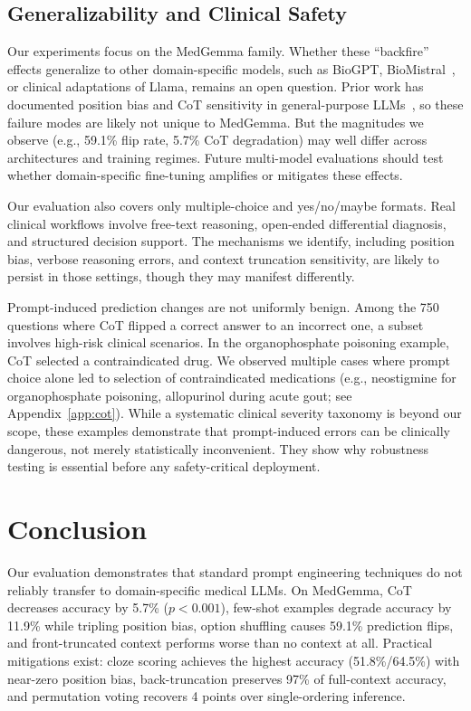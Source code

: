 \documentclass[runningheads,a4paper]{llncs}
\begin{document}
\subsection{Generalizability and Clinical Safety}

Our experiments focus on the MedGemma family. Whether these ``backfire'' effects generalize to other domain-specific models, such as BioGPT, BioMistral~\cite{labrak2024biomistral}, or clinical adaptations of Llama, remains an open question. Prior work has documented position bias and CoT sensitivity in general-purpose LLMs~\cite{zheng2024llm,liu2024mindyourstep}, so these failure modes are likely not unique to MedGemma. But the magnitudes we observe (e.g., 59.1\% flip rate, 5.7\% CoT degradation) may well differ across architectures and training regimes. Future multi-model evaluations should test whether domain-specific fine-tuning amplifies or mitigates these effects.

Our evaluation also covers only multiple-choice and yes/no/maybe formats. Real clinical workflows involve free-text reasoning, open-ended differential diagnosis, and structured decision support. The mechanisms we identify, including position bias, verbose reasoning errors, and context truncation sensitivity, are likely to persist in those settings, though they may manifest differently.

Prompt-induced prediction changes are not uniformly benign. Among the 750 questions where CoT flipped a correct answer to an incorrect one, a subset involves high-risk clinical scenarios. In the organophosphate poisoning example, CoT selected a contraindicated drug. We observed multiple cases where prompt choice alone led to selection of contraindicated medications (e.g., neostigmine for organophosphate poisoning, allopurinol during acute gout; see Appendix~\ref{app:cot}). While a systematic clinical severity taxonomy is beyond our scope, these examples demonstrate that prompt-induced errors can be clinically dangerous, not merely statistically inconvenient. They show why robustness testing is essential before any safety-critical deployment.

\section{Conclusion}

Our evaluation demonstrates that standard prompt engineering techniques do not reliably transfer to domain-specific medical LLMs. On MedGemma, CoT decreases accuracy by 5.7\% ($p < 0.001$), few-shot examples degrade accuracy by 11.9\% while tripling position bias, option shuffling causes 59.1\% prediction flips, and front-truncated context performs worse than no context at all. Practical mitigations exist: cloze scoring achieves the highest accuracy (51.8\%/64.5\%) with near-zero position bias, back-truncation preserves 97\% of full-context accuracy, and permutation voting recovers 4 points over single-ordering inference.
\end{document}

